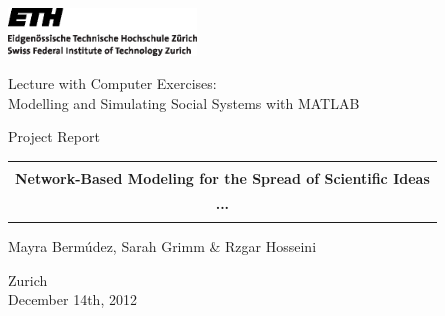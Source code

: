 
\thispagestyle{empty}

\begin{center}
\includegraphics[width=5cm]{ETHlogo.eps}

\bigskip


\bigskip


\bigskip


\LARGE{ 	Lecture with Computer Exercises:\\ }
\LARGE{ Modelling and Simulating Social Systems with MATLAB\\}

\bigskip

\bigskip

\small{Project Report}\\

\bigskip

\bigskip

\bigskip

\bigskip


\begin{tabular}{|c|}
\hline
\\
\textbf{\LARGE{Network-Based Modeling for the Spread of Scientific Ideas}}\\
\textbf{\LARGE{...}}\\
\\
\hline
\end{tabular}
\bigskip

\bigskip

\bigskip

\LARGE{Mayra Berm\'udez, Sarah Grimm \& Rzgar Hosseini}



\bigskip

\bigskip

\bigskip

\bigskip

\bigskip

\bigskip

\bigskip

\bigskip

Zurich\\
December 14th, 2012\\

\end{center}


